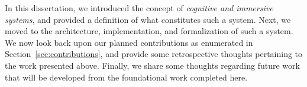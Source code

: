 In this dissertation, we introduced the concept of \textit{cognitive
and immersive systems}, and provided a definition of what constitutes
such a system.  Next, we moved to the architecture, implementation,
and formalization of such a system.  We now look back upon our planned
contributions as enumerated in Section~\ref{sec:contributions}, and
provide some retrospective thoughts pertaining to the work presented
above.  Finally, we share some thoughts regarding future work that
will be developed from the foundational work completed here.